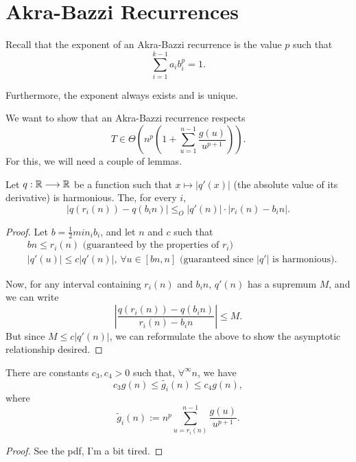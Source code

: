 
\section*{Akra-Bazzi Recurrences}

\begin{previouslyseen}
    Recall that the exponent of an Akra-Bazzi recurrence is the value $p$ such that \[
    \sum_{i=1}^{k-1} a_i b_i^{p} = 1
    .\] 

    Furthermore, the exponent always exists and is unique.
\end{previouslyseen}

We want to show that an Akra-Bazzi recurrence respects \[
    T \in \Theta\left( n^{p}\left( 1 + \sum_{u=1}^{n-1} \frac{g(u)}{u^{p+1}} \right)  \right) 
.\] For this, we will need a couple of lemmas.

\begin{lemma}
    Let $q: \mathbb{R} \longrightarrow \mathbb{R}$ be a function such that $x \mapsto |q'(x)|$ (the absolute value of its derivative) is harmonious.
    The, for every $i$,\[
    \left| q(r_i(n)) - q(b_in) \right| \le_O |q'(n)|\cdot |r_i(n)-b_in|
    .\] 
\end{lemma}
\begin{proof}
    Let $b=\frac{1}{2}min_i b_i$, and let $n$ and $c$ such that
    \begin{align*}
	&bn \le r_i(n) \text{ (guaranteed by the properties of $r_i$)} \\
	& |q'(u)| \le c|q'(n)|,\, \forall u \in \left[ bn,n \right]  \text{ (guaranteed since $|q'|$ is harmonious)}
    .\end{align*}

    Now, for any interval containing $r_i(n)$ and $b_i n$, $q'(n)$ has a supremum $M$, and we can write \[
    \left| \frac{q(r_i(n)) - q(b_i n)}{r_i(n) - b_i n} \right| \le M
    .\] But since $M \le c|q'(n)|$, we can reformulate the above to show the asymptotic relationship desired.
\end{proof}

\begin{lemma}
    There are constants $c_3,c_4>0$ such that, $\forall^{\infty} n$, we have \[
    c_3 g(n) \le \widetilde{g_i}(n) \le c_4 g(n)
    ,\] where \[
    \widetilde{g}_i (n) := n^{p} \sum_{u=r_i(n)}^{n-1} \frac{g(u)}{u^{p+1}}
    .\] 
\end{lemma}
\begin{proof}
    See the pdf, I'm a bit tired.
\end{proof}


